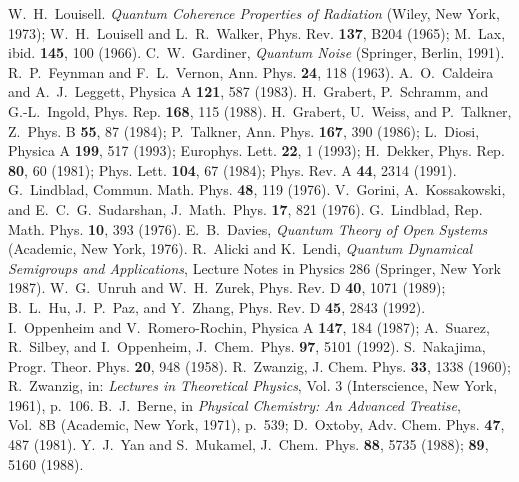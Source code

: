 \documentclass[12pt,twoside,a4paper]{report}
\begin{document}
{\begin{thebibliography}{999}
                 W.~H.~Louisell. {\it Quantum Coherence Properties of 
                 Radiation} (Wiley, New York, 1973);
                 W.~H.~Louisell and L.~R.~Walker, 
                 Phys. Rev. {\bf 137}, B204 (1965);
                 M.~Lax, {ibid.} {\bf 145}, 100 (1966).
 C.~W.~Gardiner, {\it Quantum Noise} (Springer, Berlin, 1991).
 R.~P.~Feynman and F.~L.~Vernon, 
                 Ann. Phys. {\bf 24}, 118 (1963).
 A.~O.~Caldeira and A.~J.~Leggett, 
                 Physica A {\bf 121}, 587 (1983).
 H.~Grabert, P.~Schramm, and G.-L.~Ingold,
                 Phys. Rep. {\bf 168}, 115 (1988).
                 H.~Grabert, U.~Weiss, and P.~Talkner,
                 Z.~Phys. B {\bf 55}, 87 (1984);
                 P.~Talkner, Ann. Phys. {\bf 167}, 390 (1986);
                 L.~Diosi, Physica A {\bf 199}, 517 (1993);
                 Europhys. Lett. {\bf 22}, 1 (1993);
                 H.~Dekker, Phys. Rep. {\bf 80}, 60 (1981);
                 Phys. Lett. {\bf 104}, 67 (1984);
                 Phys. Rev. A {\bf 44}, 2314 (1991).
 G.~Lindblad, Commun. Math. Phys. {\bf 48}, 119 (1976).
 V.~Gorini, A.~Kossakowski, and E.~C.~G.~Sudarshan, 
                 J.~Math.~Phys. {\bf 17}, 821 (1976).
 G.~Lindblad, Rep. Math. Phys. {\bf 10}, 393 (1976).
 E.~B.~Davies, {\it Quantum Theory of Open Systems}
                 (Academic, New York, 1976).
 R.~Alicki and K.~Lendi, 
                 {\it Quantum Dynamical Semigroups and Applications},
                 Lecture Notes in Physics 286 (Springer, New York 1987).
 W.~G.~Unruh and W.~H.~Zurek, 
                 Phys. Rev. D {\bf 40}, 1071 (1989);
                 B.~L.~Hu, J.~P.~Paz, and Y.~Zhang,
                 Phys. Rev. D {\bf 45}, 2843 (1992).
 I.~Oppenheim and V.~Romero-Rochin, 
                 Physica A {\bf 147}, 184 (1987);
                 A.~Suarez, R.~Silbey, and I.~Oppenheim,
                 J.~Chem.~Phys. {\bf 97}, 5101 (1992).
 S.~Nakajima, Progr. Theor. Phys. {\bf 20}, 948 (1958).
 R.~Zwanzig, J. Chem. Phys. {\bf 33}, 1338 (1960);
                 R.~Zwanzig, in: {\it Lectures in Theoretical Physics}, Vol. 3
                 (Interscience, New York, 1961), p.~106.
 B.~J.~Berne, in 
                 {\it Physical Chemistry: An Advanced Treatise}, Vol.~8B 
                 (Academic, New York, 1971), p.~539;
                 D.~Oxtoby, Adv. Chem. Phys. {\bf 47}, 487 (1981).
 Y.~J.~Yan and S.~Mukamel, 
                 J.~Chem.~Phys. {\bf 88}, 5735 (1988); {\bf 89}, 5160 (1988).




\end{thebibliography}}
\end{document}
